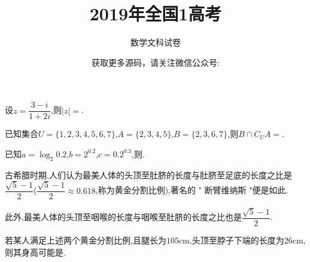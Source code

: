 \documentclass[windows,list]{BHCexam}
\begin{document}
\title{2019年全国1高考}
\subtitle{数学文科试卷}
\author{获取更多源码，请关注微信公众号:}
\date{}
\maketitle
\begin{groups}
\begin{questions}[]
\begin{minipage}{\linewidth}
\question[5] 设$z= \dfrac {3-i}{1+2i}$,则$|z|=$.
\begin{solution}{4cm}

\end{solution}
\end{minipage}

\vfill

\begin{minipage}{\linewidth}
\question[5] 已知集合$U=\{1 , 2 , 3 , 4 , 5 , 6 , 7\}$,$A=\{2 , 3 , 4 , 5\}$,$B=\{2 , 3 , 6 , 7\}$,则$B \cap  {C}_{U}A =$.

\begin{solution}{4cm}

\end{solution}
\end{minipage}
\vfill
\begin{minipage}{\linewidth}
\question[5] 已知$a=\log _{2} 0.2$,$b=2 ^{0.2}$,$c=0.2 ^{0.3}$,则.
\begin{solution}{4cm}

\end{solution}
\end{minipage}
\vfill
\begin{minipage}{\linewidth}
	
\question[5] 古希腊时期,人们认为最美人体的头顶至肚脐的长度与肚脐至足底的长度之比是$\dfrac{ \sqrt{5} - 1}{2}$($\dfrac{ \sqrt{5} - 1}{2}  \approx 0.618$,称为黄金分割比例),著名的 " 断臂维纳斯 "便是如此.

此外,最美人体的头顶至咽喉的长度与咽喉至肚脐的长度之比也是$\dfrac{ \sqrt{5} - 1}{2}$.

若某人满足上述两个黄金分割比例,且腿长为$105\text{cm}$,头顶至脖子下端的长度为$26 \text{cm}$,则其身高可能是.


\end{minipage}
\end{questions}
\end{groups}
\end{document}
